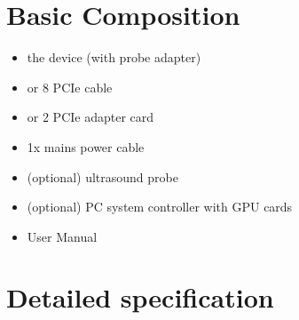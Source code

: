 \documentclass[letterpaper,10pt,english]{sphinxmanual}
\begin{document}
\section{Basic Composition}
\label{\detokenize{content/technical_specification:basic-composition}}\begin{itemize}
\item {} 
\sphinxAtStartPar
the  device (with probe adapter)

\item {} 
 or 8 PCIe cable

\item {} 
 or 2 PCIe adapter card

\item {} 
\sphinxAtStartPar
1x mains power cable

\item {} 
\sphinxAtStartPar
(optional) ultrasound probe

\item {} 
\sphinxAtStartPar
(optional) PC system controller with GPU cards

\item {} 
\sphinxAtStartPar
User Manual

\end{itemize}


\section{Detailed specification}
\label{\detokenize{content/technical_specification:detailed-specification}}
\end{document}

